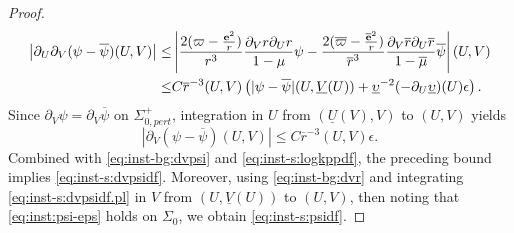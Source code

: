 \documentclass[10pt, reqno]{amsart}
\theoremstyle{definition}
\theoremstyle{remark}
\theoremstyle{conjecture}
\numberwithin{equation}{section}
\newcommand{\abs}[1]{\vert#1\vert}
\newcommand{\rd}{\partial}
\newcommand{\0}{\emptyset}
\newcommand{\eps}{\epsilon}
\newcommand{\Sgm}{\Sigma}
\newcommand{\ups}{\upsilon}
\newcommand{\bfe}{{\bf e}}
\newcommand{\e}{\bfe}							%
\newcommand{\psibg}{\overline{\psi}}				%
\newcommand{\rbg}{\overline{r}}					%
\newcommand{\varpibg}{\overline{\varpi}}				%
\newcommand{\mubg}{\overline{\mu}}				%
\newcommand{\ebg}{\overline{\e}}					%
\newcommand{\Abs}[1]{\left\vert #1 \right\vert}
\begin{document}
\begin{proof}
\begin{align}
	\Abs{\rd_{U} \rd_{V} (\psi - \psibg)(U, V)} 
	\leq & \Abs{\frac{2 (\varpi - \frac{\e^{2}}{r})}{r^{3}} \frac{\rd_{V} r \rd_{U} r}{1-\mu} \psi - \frac{2 (\varpibg - \frac{\ebg^{2}}{r})}{\rbg^{3}} \frac{\rd_{V} \rbg \rd_{U} \rbg}{1-\mubg} \psibg}(U,V) \notag\\
	\leq & C \rbg^{-3} (U, V) \left( \abs{\psi - \psibg}(U, \underline{V}(U)) + \underline{\ups}^{-2} (- \rd_{U} \underline{\ups}) (U) \eps \right) .\label{eq:inst-s:dudvpsidf}
\end{align}
Since $\rd_{V} \psi = \rd_{V} \psibg$ on $\Sgm_{0, pert}^{+}$, integration in $U$ from $(\underline{U}(V), V)$ to $(U, V)$ yields
\begin{equation}\label{eq:inst-s:dvpsidf.pl}
	\Abs{\rd_{V} (\psi - \psibg)(U, V)} \leq C \rbg^{-3} (U, V) \eps.
\end{equation}
Combined with \eqref{eq:inst-bg:dvpsi} and \eqref{eq:inst-s:logkppdf}, the preceding bound implies \eqref{eq:inst-s:dvpsidf}. Moreover, 
using \eqref{eq:inst-bg:dvr} and integrating \eqref{eq:inst-s:dvpsidf.pl} in $V$ from $(U, \underline{V}(U))$ to $(U, V)$, then noting that \eqref{eq:inst:psi-eps} holds on $\Sgm_{0}$, we obtain \eqref{eq:inst-s:psidf}. 

\qedhere


\end{proof}
\end{document}
